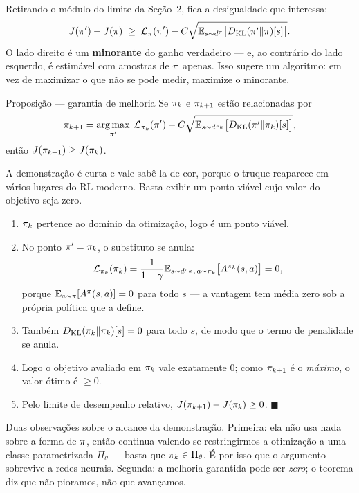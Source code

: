 \documentclass[11pt]{article}
\newcommand{\thv}{\theta}
\newcommand{\polk}{\pol_{k}}
\newcommand{\polnovo}{\pol'}
\newcommand{\Advpi}{A^{\pol}}
\newcommand{\Dkl}{D_{\mathrm{KL}}}
\newcommand{\dpi}{d^{\pol}}
\newcommand{\Lsub}[1]{\mathcal{L}_{#1}}
\begin{document}
Retirando o módulo do limite da Seção~2, fica a desigualdade que interessa:
\[
  J(\polnovo) - J(\pol) \;\ge\; \Lsub{\pol}(\polnovo)
     - C\sqrt{\E_{s\sim\dpi}\bigl[\Dkl(\polnovo\|\pol)[s]\bigr]}.
\]
O lado direito é um \textbf{minorante} do ganho verdadeiro --- e, ao contrário do lado
esquerdo, é estimável com amostras de $\pi$ apenas. Isso sugere um algoritmo: em vez de
maximizar o que não se pode medir, maximize o minorante.

\begin{teobox}{Proposição --- garantia de melhoria}
  Se $\polk$ e $\pi_{k+1}$ estão relacionadas por
  \[
    \pol_{k+1} = \argmax_{\polnovo}\;
      \Lsub{\polk}(\polnovo) - C\sqrt{\E_{s\sim d^{\polk}}\bigl[\Dkl(\polnovo\|\polk)[s]\bigr]},
  \]
  então $J(\pol_{k+1}) \ge J(\polk)$.
\end{teobox}

\begin{provabox}
A demonstração é curta e vale sabê-la de cor, porque o truque reaparece em vários lugares
do RL moderno. Basta exibir um ponto viável cujo valor do objetivo seja zero.

\begin{enumerate}
  \item $\polk$ pertence ao domínio da otimização, logo é um ponto viável.
  \item No ponto $\polnovo = \polk$, o substituto se anula:
    \[
      \Lsub{\polk}(\polk) = \frac{1}{1-\gamma}
        \E_{s\sim d^{\polk},\,a\sim\polk}\bigl[A^{\polk}(s,a)\bigr] = 0,
    \]
    porque $\E_{a\sim\pol}[\Advpi(s,a)] = 0$ para todo $s$ --- a vantagem tem média zero
    sob a própria política que a define.
  \item Também $\Dkl(\polk\|\polk)[s] = 0$ para todo $s$, de modo que o termo de
    penalidade se anula.
  \item Logo o objetivo avaliado em $\polk$ vale exatamente $0$; como $\pi_{k+1}$ é o
    \emph{máximo}, o valor ótimo é $\ge 0$.
  \item Pelo limite de desempenho relativo, $J(\pol_{k+1}) - J(\polk) \ge 0$.
    \hfill$\blacksquare$
\end{enumerate}

Duas observações sobre o alcance da demonstração. Primeira: ela não usa nada sobre a
forma de $\pi$, então continua valendo se restringirmos a otimização a uma classe
parametrizada $\Pi_\thv$ --- basta que $\polk\in\Pi_\thv$. É por isso que o argumento
sobrevive a redes neurais. Segunda: a melhoria garantida pode ser \emph{zero}; o teorema
diz que não pioramos, não que avançamos.
\end{provabox}
\end{document}
